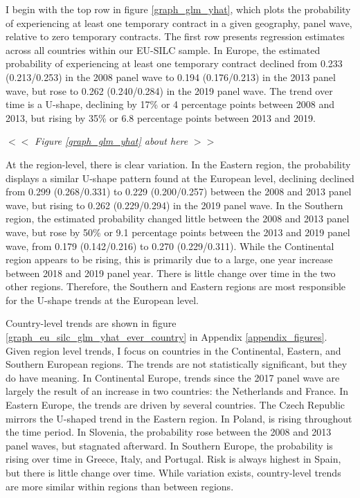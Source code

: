 \documentclass[12pt]{article}
\begin{document}
I begin with the top row in figure \ref{graph_glm_yhat}, which plots the probability of experiencing at least one temporary contract in a given geography, panel wave, relative to zero temporary contracts.  The first row presents regression estimates across all countries within our EU-SILC sample.  In Europe, the estimated probability of experiencing at least one temporary contract declined from 0.233 (0.213/0.253) in the 2008 panel wave to 0.194 (0.176/0.213) in the 2013 panel wave, but rose to 0.262 (0.240/0.284) in the 2019 panel wave.  The trend over time is a U-shape, declining by 17\% or 4 percentage points between 2008 and 2013, but rising by 35\% or 6.8 percentage points between 2013 and 2019.  

\begin{center}
$<<$ \emph{Figure \ref{graph_glm_yhat} about here} $>>$
\end{center}

At the region-level, there is clear variation.  In the Eastern region, the probability displays a similar U-shape pattern found at the European level, declining declined from 0.299 (0.268/0.331) to 0.229 (0.200/0.257) between the 2008 and 2013 panel wave, but rising to 0.262 (0.229/0.294) in the 2019 panel wave.  In the Southern region, the estimated probability changed little between the 2008 and 2013 panel wave, but rose by 50\% or 9.1 percentage points between the 2013 and 2019 panel wave, from 0.179 (0.142/0.216) to 0.270 (0.229/0.311).  While the Continental region appears to be rising, this is primarily due to a large, one year increase between 2018 and 2019 panel year.  There is little change over time in the two other regions.  Therefore, the Southern and Eastern regions are most responsible for the U-shape trends at the European level.  

Country-level trends are shown in figure \ref{graph_eu_silc_glm_yhat_ever_country} in Appendix \ref{appendix_figures}.  Given region level trends, I focus on countries in the Continental, Eastern, and Southern European regions.  The trends are not statistically significant, but they do have meaning.  In Continental Europe, trends since the 2017 panel wave are largely the result of an increase in two countries: the Netherlands and France.  In Eastern Europe, the trends are driven by several countries.  The Czech Republic mirrors the U-shaped trend in the Eastern region.  In Poland, is rising throughout the time period.  In Slovenia, the probability rose between the 2008 and 2013 panel waves, but stagnated afterward.  In Southern Europe, the probability is rising over time in Greece, Italy, and Portugal.  Risk is always highest in Spain, but there is little change over time.  While variation exists, country-level trends are more similar within regions than between regions.
\end{document}
